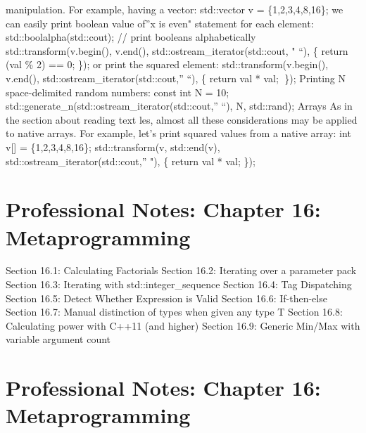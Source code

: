 manipulation. For example, having a vector: std::vector v =
\{1,2,3,4,8,16\}; we can easily print boolean value of''x is even"
statement for each element: std::boolalpha(std::cout); // print booleans
alphabetically std::transform(v.begin(), v.end(),
std::ostream\_iterator(std::cout, " ``), \href{int\%20val}{} \{ return
(val \% 2) == 0; \}); or print the squared element:
std::transform(v.begin(), v.end(), std::ostream\_iterator(std::cout,''
``), \href{int\%20val}{} \{ return val * val; \}); Printing N
space-delimited random numbers: const int N = 10;
std::generate\_n(std::ostream\_iterator(std::cout,'' ``), N, std::rand);
Arrays As in the section about reading text les, almost all these
considerations may be applied to native arrays. For example, let's print
squared values from a native array: int v{[}{]} = \{1,2,3,4,8,16\};
std::transform(v, std::end(v), std::ostream\_iterator(std::cout,'' "),
\href{int\%20val}{} \{ return val * val; \});

\hypertarget{professional-notes-chapter-16-metaprogramming}{%
\chapter{Professional Notes: Chapter 16:
Metaprogramming}\label{professional-notes-chapter-16-metaprogramming}}

Section 16.1: Calculating Factorials Section 16.2: Iterating over a
parameter pack Section 16.3: Iterating with std::integer\_sequence
Section 16.4: Tag Dispatching Section 16.5: Detect Whether Expression is
Valid Section 16.6: If-then-else Section 16.7: Manual distinction of
types when given any type T Section 16.8: Calculating power with C++11
(and higher) Section 16.9: Generic Min/Max with variable argument count

\hypertarget{professional-notes-chapter-16-metaprogramming-1}{%
\chapter{Professional Notes: Chapter 16:
Metaprogramming}\label{professional-notes-chapter-16-metaprogramming-1}}

